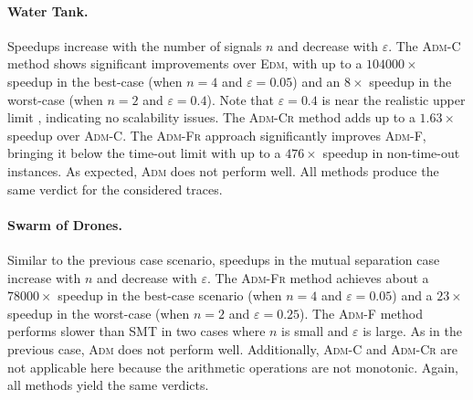 \documentclass[iicol,lineno]{sn-jnl}
\newcommand{\?}{\text{?}}
\begin{document}
		
		\paragraph*{Water Tank.}
		Speedups increase with the number of signals \(n\) and decrease with \(\varepsilon\).
		The \textsc{Adm-C} method shows significant improvements over \textsc{Edm}, with up to a $104000\times$ speedup in the best-case (when \(n=4\) and \(\varepsilon=0.05\)) and an $8\times$ speedup in the worst-case (when \(n=2\) and \(\varepsilon=0.4\)).
		Note that \(\varepsilon=0.4\) is near the realistic upper limit \cite{MomtazAB23}, indicating no scalability issues.
		The \textsc{Adm-Cr} method adds up to a $1.63\times$ speedup over \textsc{Adm-C}.
		The \textsc{Adm-Fr} approach significantly improves \textsc{Adm-F}, bringing it below the time-out limit with up to a $476\times$ speedup in non-time-out instances.
		As expected, \textsc{Adm} does not perform well.
		All methods produce the same verdict for the considered traces.
		
		
		
		\paragraph*{Swarm of Drones.}
		Similar to the previous case scenario, speedups in the mutual separation case increase with \(n\) and decrease with \(\varepsilon\).
		The \textsc{Adm-Fr} method achieves about a $78000\times$ speedup in the best-case scenario (when \(n=4\) and \(\varepsilon=0.05\)) and a $23\times$ speedup in the worst-case (when \(n=2\) and \(\varepsilon=0.25\)).
		The \textsc{Adm-F} method performs slower than SMT in two cases where \(n\) is small and \(\varepsilon\) is large.
		As in the previous case, \textsc{Adm} does not perform well.
		Additionally, \textsc{Adm-C} and \textsc{Adm-Cr} are not applicable here because the arithmetic operations are not monotonic.
		Again, all methods yield the same verdicts.
		
\end{document}
